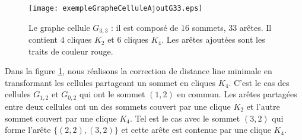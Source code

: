 \begin{figure}[htb!] 
\centering
\texttt{[image: exempleGrapheCelluleAjoutG33.eps]}
\caption{ Le graphe cellule $G_{3,3}$ : il est compos\'e de $16$ sommets, $33$ ar\^etes. Il contient $4$ cliques $K_{2}$ et $6$ cliques $K_4$. Les ar\^etes ajout\'ees sont les traits de couleur rouge.}
\label{exempleCorrectionGrapheCelluleAvecAjout}
\end{figure}
Dans la figure \ref{exempleCorrectionGrapheCelluleAvecAjout}, nous r\'ealisons la correction de distance line minimale en transformant les cellules partageant un sommet en cliques $K_4$. C'est le cas des cellules $G_{1,2}$ et  $G_{0,2}$ qui ont le sommet $(1,2)$ en commun. 
Les ar\^etes partag\'ees entre deux cellules ont un des sommets couvert par une clique $K_2$ et l'autre sommet couvert par une clique $K_4$. Tel est le cas avec le sommet $(3,2)$ qui forme l'ar\^ete $\{(2,2),(3,2)\}$ et cette ar\^ete est contenue par une clique $K_4$.

